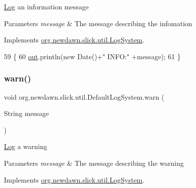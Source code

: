 \mbox{\hyperlink{classorg_1_1newdawn_1_1slick_1_1util_1_1_log}{Log}} an information message


\begin{DoxyParams}{Parameters}
{\em message} & The message describing the infomation \\
\hline
\end{DoxyParams}


Implements \mbox{\hyperlink{interfaceorg_1_1newdawn_1_1slick_1_1util_1_1_log_system_a8430f000d206c109e47bea6a30b93be7}{org.\+newdawn.\+slick.\+util.\+Log\+System}}.


\begin{DoxyCode}
59                                       \{
60         \mbox{\hyperlink{classorg_1_1newdawn_1_1slick_1_1util_1_1_default_log_system_af8720c665caabb6455863d23de8617da}{out}}.println(\textcolor{keyword}{new} Date()+\textcolor{stringliteral}{" INFO:"} +message);
61     \}
\end{DoxyCode}
\mbox{\label{classorg_1_1newdawn_1_1slick_1_1util_1_1_default_log_system_a43bae56fa5d877bbdee7a413e3699f63}} 
\subsubsection{\texorpdfstring{warn()}{warn()}\hspace{0.1cm}{\footnotesize\ttfamily [1/2]}}
{\footnotesize\ttfamily void org.\+newdawn.\+slick.\+util.\+Default\+Log\+System.\+warn (\begin{DoxyParamCaption}\item[{String}]{message }\end{DoxyParamCaption})\hspace{0.3cm}{\ttfamily [inline]}}

\mbox{\hyperlink{classorg_1_1newdawn_1_1slick_1_1util_1_1_log}{Log}} a warning


\begin{DoxyParams}{Parameters}
{\em message} & The message describing the warning \\
\hline
\end{DoxyParams}


Implements \mbox{\hyperlink{interfaceorg_1_1newdawn_1_1slick_1_1util_1_1_log_system_a4c4f5a96667389bbca64c86f63272b7d}{org.\+newdawn.\+slick.\+util.\+Log\+System}}.


